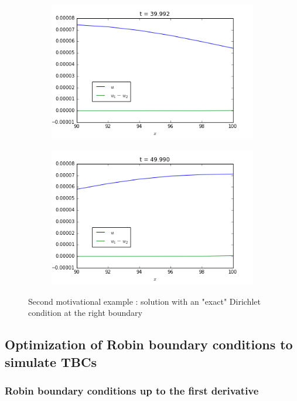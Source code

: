 \begin{figure}[h]
	\begin{subfigure}{.5\linewidth}
		\includegraphics[scale=.5]{figures/motivational2A.png}	
	\end{subfigure}
	\begin{subfigure}{.5\linewidth}
		\includegraphics[scale=.5]{figures/motivational2B.png}	
	\end{subfigure}
	\caption{Second motivational example : solution with an "exact" Dirichlet condition at the right boundary \label{fig:motivation2}}
\end{figure}

\subsection{Optimization of Robin boundary conditions to simulate TBCs}

\subsubsection{Robin boundary conditions up to the first derivative}

